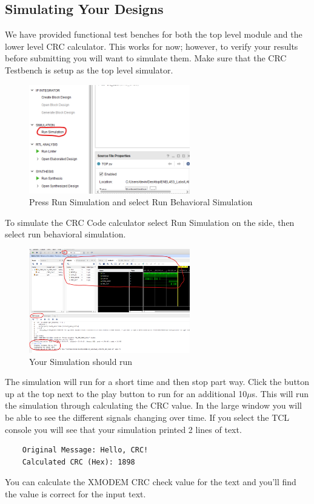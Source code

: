 \subsection{Simulating Your Designs}
We have provided functional test benches for both the top level module and the lower level CRC calculator. This works for now; however, to verify your results before submitting you will want to simulate them. Make sure that the CRC Testbench is setup as the top level simulator.

\begin{figure}[H]
    \centering
    \includegraphics[width=7cm]{Images/SimulatingDesign/Run_Simulation_Page1.png}
    \caption{Press Run Simulation and select Run Behavioral Simulation}
    \label{fig:enter-label}
\end{figure}
To simulate the CRC Code calculator select Run Simulation on the side, then select run behavioral simulation. 
\begin{figure}[H]
    \centering
    \includegraphics[width=7cm]{Images/SimulatingDesign/Run_Simulation_Page2.png}
    \caption{Your Simulation should run}
    \label{fig:enter-label}
\end{figure}
The simulation will run for a short time and then stop part way. Click the button up at the top next to the play button to run for an additional 10\begin{math}\mu\end{math}s. This will run the simulation through calculating the CRC value. In the large window you will be able to see the different signals changing over time. If you select the TCL console you will see that your simulation printed 2 lines of text.\\
\begin{verbatim}
    Original Message: Hello, CRC!
    Calculated CRC (Hex): 1898
\end{verbatim}
You can calculate the XMODEM CRC check value for the text and you'll find the value is correct for the input text. 
